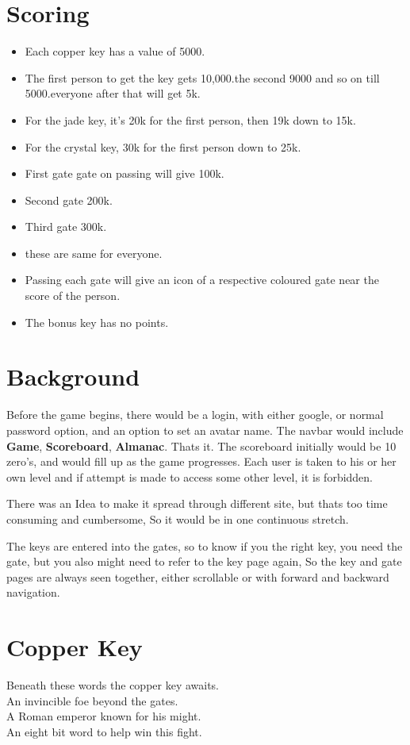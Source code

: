 \documentclass[12pt]{article}
\begin{document}
\section{Scoring}
\begin{itemize}
\item Each copper key has a value of 5000.
\item The first person to get the key gets 10,000.the second 9000 and so on till 5000.everyone after that will get 5k.
\item For the jade key, it's 20k for the first person, then 19k down to 15k.
\item For the crystal key, 30k for the first person down to 25k.

\item First gate gate on passing will give 100k.
\item Second gate 200k.
\item Third gate 300k.
\item these are same for everyone.
\item Passing each gate will give an icon of a respective coloured gate near the score of the person.

\item The bonus key has no points.
\end{itemize}

\section{Background}
Before the game begins, there would be a login, with either google, or normal password option, and an option to set an avatar name. The navbar would include \textbf{Game}, \textbf{Scoreboard}, \textbf{Almanac}. Thats it. The scoreboard initially would be 10 zero's, and would fill up as the game progresses. Each user is taken to his or her own level and if attempt is made to access some other level, it is forbidden.

There was an Idea to make it spread through different site, but thats too time consuming and cumbersome, So it would be in one continuous stretch.

The keys are entered into the gates, so to know if you the right key, you need the gate, but you also might need to refer to the key page again, So the key and gate pages are always seen together, either scrollable or with forward and backward navigation.
\section{Copper Key}
\begin{centering}
Beneath these words the copper key awaits. \\
An invincible foe beyond the gates.\\
A Roman emperor known for his might.\\
An eight bit word to help win this fight.\\
\end{centering}
\end{document}
